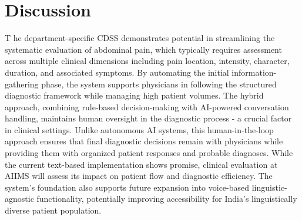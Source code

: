 \section{Discussion}
\lettrine{T}{ }he department-specific CDSS demonstrates potential in streamlining the systematic evaluation of abdominal pain, which typically requires assessment across multiple clinical dimensions including pain location, intensity, character, duration, and associated symptoms. By automating the initial information-gathering phase, the system supports physicians in following the structured diagnostic framework while managing high patient volumes. The hybrid approach, combining rule-based decision-making with AI-powered conversation handling, maintains human oversight in the diagnostic process - a crucial factor in clinical settings. Unlike autonomous AI systems, this human-in-the-loop approach ensures that final diagnostic decisions remain with physicians while providing them with organized patient responses and probable diagnoses. While the current text-based implementation shows promise, clinical evaluation at AIIMS will assess its impact on patient flow and diagnostic efficiency. The system's foundation also supports future expansion into voice-based linguistic-agnostic functionality, potentially improving accessibility for India's linguistically diverse patient population.